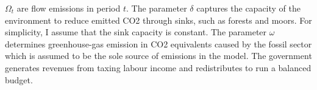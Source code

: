 $\Omega_t$ are flow emissions in period $t$.  The parameter $\delta$ captures the capacity of the environment to reduce emitted CO2 through sinks, such as forests and moors.  For simplicity, I assume that the sink capacity is constant. The parameter $\omega$ determines greenhouse-gas emission in CO2 equivalents caused by the fossil sector which is assumed to be the sole source of emissions in the model. %
The government generates revenues from taxing labour income and redistributes to run a balanced budget. 


